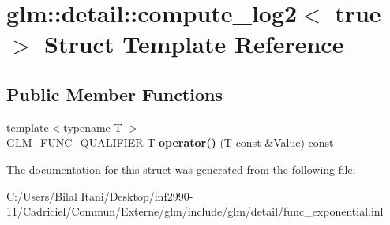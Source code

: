 \hypertarget{structglm_1_1detail_1_1compute__log2_3_01true_01_4}{}\section{glm\+:\+:detail\+:\+:compute\+\_\+log2$<$ true $>$ Struct Template Reference}
\label{structglm_1_1detail_1_1compute__log2_3_01true_01_4}
\subsection*{Public Member Functions}
\begin{DoxyCompactItemize}
\item 
{\footnotesize template$<$typename T $>$ }\\G\+L\+M\+\_\+\+F\+U\+N\+C\+\_\+\+Q\+U\+A\+L\+I\+F\+I\+ER T {\bfseries operator()} (T const \&\hyperlink{document_8h_a071cf97155ba72ac9a1fc4ad7e63d481}{Value}) const \hypertarget{structglm_1_1detail_1_1compute__log2_3_01true_01_4_a4b8abe824c3c88324a640b5d88cbce99}{}\label{structglm_1_1detail_1_1compute__log2_3_01true_01_4_a4b8abe824c3c88324a640b5d88cbce99}

\end{DoxyCompactItemize}


The documentation for this struct was generated from the following file\+:\begin{DoxyCompactItemize}
\item 
C\+:/\+Users/\+Bilal Itani/\+Desktop/inf2990-\/11/\+Cadriciel/\+Commun/\+Externe/glm/include/glm/detail/func\+\_\+exponential.\+inl\end{DoxyCompactItemize}

